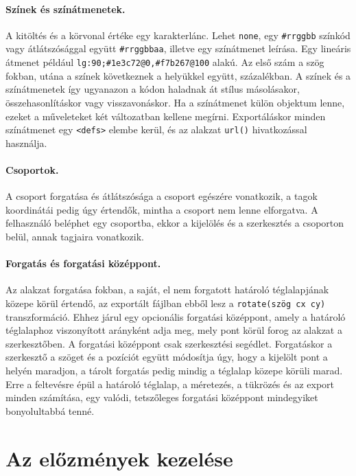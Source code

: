 \paragraph{Színek és színátmenetek.} A kitöltés és a körvonal értéke egy karakterlánc. Lehet \texttt{none}, egy \texttt{\#rrggbb} színkód vagy átlátszósággal együtt \texttt{\#rrggbbaa}, illetve egy színátmenet leírása. Egy lineáris átmenet például \texttt{lg:90;\#1e3c72@0,\#f7b267@100} alakú. Az első szám a szög fokban, utána a színek következnek a helyükkel együtt, százalékban. A színek és a színátmenetek így ugyanazon a kódon haladnak át stílus másolásakor, összehasonlításkor vagy visszavonáskor. Ha a színátmenet külön objektum lenne, ezeket a műveleteket két változatban kellene megírni. Exportáláskor minden színátmenet egy \texttt{<defs>} elembe kerül, és az alakzat \texttt{url()} hivatkozással használja.

\paragraph{Csoportok.} A csoport forgatása és átlátszósága a csoport egészére vonatkozik, a tagok koordinátái pedig úgy értendők, mintha a csoport nem lenne elforgatva. A felhasználó beléphet egy csoportba, ekkor a kijelölés és a szerkesztés a csoporton belül, annak tagjaira vonatkozik.

\paragraph{Forgatás és forgatási középpont.} Az alakzat forgatása fokban, a saját, el nem forgatott határoló téglalapjának közepe körül értendő, az exportált fájlban ebből lesz a \texttt{rotate(szög cx cy)} transzformáció. Ehhez járul egy opcionális forgatási középpont, amely a határoló téglalaphoz viszonyított arányként adja meg, mely pont körül forog az alakzat a szerkesztőben. A forgatási középpont csak szerkesztési segédlet. Forgatáskor a szerkesztő a szöget és a pozíciót együtt módosítja úgy, hogy a kijelölt pont a helyén maradjon, a tárolt forgatás pedig mindig a téglalap közepe körüli marad. Erre a feltevésre épül a határoló téglalap, a méretezés, a tükrözés és az export minden számítása, egy valódi, tetszőleges forgatási középpont mindegyiket bonyolultabbá tenné.

\section{Az előzmények kezelése}
\label{sec:history_design}

